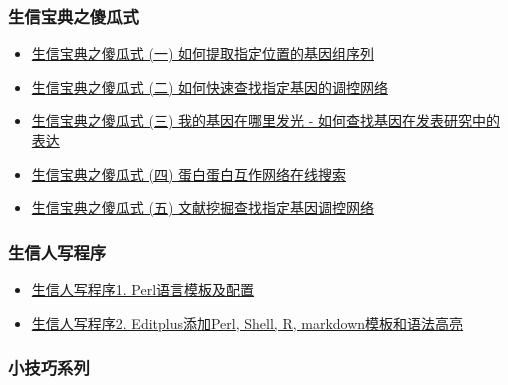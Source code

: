 \documentclass[]{article}
\providecommand{\tightlist}{%
  \setlength{\itemsep}{0pt}\setlength{\parskip}{0pt}}
\numberwithin{figure}{section}
\numberwithin{table}{section}
\begin{document}
\hypertarget{ux751fux4fe1ux5b9dux5178ux4e4bux50bbux74dcux5f0f}{%
\subsubsection{生信宝典之傻瓜式}\label{ux751fux4fe1ux5b9dux5178ux4e4bux50bbux74dcux5f0f}}

\begin{itemize}
\tightlist
\item
  \href{http://mp.weixin.qq.com/s/5bNdHkl3QDFmCNmrht3VWA}{生信宝典之傻瓜式 (一) 如何提取指定位置的基因组序列}
\item
  \href{http://mp.weixin.qq.com/s/LPWaxbKuS-XlvzkSE-MupQ}{生信宝典之傻瓜式 (二) 如何快速查找指定基因的调控网络}
\item
  \href{http://mp.weixin.qq.com/s/0Yvhn5Tlb-zvOXM0cU16Zg}{生信宝典之傻瓜式 (三) 我的基因在哪里发光 - 如何查找基因在发表研究中的表达}
\item
  \href{http://mp.weixin.qq.com/s/JO1J66BtzuY-9a20x0XQcg}{生信宝典之傻瓜式 (四) 蛋白蛋白互作网络在线搜索}
\item
  \href{http://mp.weixin.qq.com/s/DQ4fjCL777D2iEcPTnd-rA}{生信宝典之傻瓜式 (五) 文献挖掘查找指定基因调控网络}
\end{itemize}

\hypertarget{ux751fux4fe1ux4ebaux5199ux7a0bux5e8f}{%
\subsubsection{生信人写程序}\label{ux751fux4fe1ux4ebaux5199ux7a0bux5e8f}}

\begin{itemize}
\tightlist
\item
  \href{http://mp.weixin.qq.com/s?__biz=MzI5MTcwNjA4NQ==\&mid=2247483837\&idx=1\&sn=660358a38b7fa6d3de2c95280f7a4535\&chksm=ec0dc437db7a4d21368b312ac43ceae552e1544570639c949e96bf488113a55f67fa2306008e\#rd}{生信人写程序1. Perl语言模板及配置}
\item
  \href{http://mp.weixin.qq.com/s?__biz=MzI5MTcwNjA4NQ==\&mid=2247483910\&idx=1\&sn=7813eaa4841d90b0bfc3982bb901de81\&chksm=ec0dc78cdb7a4e9a866f3e0cade3096a13366cac18c873820434f066fdba9bd22a7b5b3d210d\#rd}{生信人写程序2. Editplus添加Perl, Shell, R, markdown模板和语法高亮}
\end{itemize}

\hypertarget{ux5c0fux6280ux5de7ux7cfbux5217}{%
\subsubsection{小技巧系列}\label{ux5c0fux6280ux5de7ux7cfbux5217}}
\end{document}
